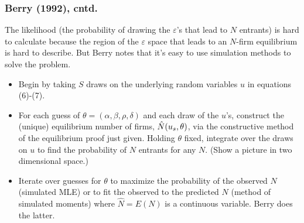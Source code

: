 \begin{frame}%

\frametitle{Berry (1992), cntd.}

The likelihood (the probability of drawing the $\varepsilon $'s that lead to 
$N$ entrants) is hard to calculate because the region of the $\varepsilon $
space that leads to an $N$-firm equilibrium is hard to describe. But Berry
notes that it's easy to use simulation methods to solve the problem.

\begin{itemize}
\item Begin by taking $S$ draws on the underlying random variables $u$ in
equations (6)-(7).

\item For each guess of $\theta =(\alpha ,\beta ,\rho ,\delta )$ and each
draw of the $u$'s, construct the (unique) equilibrium number of firms, $\hat{%
N}(u_{s},\theta )$, via the constructive method of the equilibrium proof
just given. Holding $\theta $ fixed, integrate over the draws on $u$ to find
the probability of $N$ entrants for any $N$. (Show a picture in two
dimensional space.)

\item Iterate over guesses for $\theta $ to maximize the probability of the
observed $N$ (simulated MLE) or to fit the observed to the predicted $N$
(method of simulated moments) where $\hat{N}=E(N)$ is a continuous variable.
Berry does the latter.
\end{itemize}

\end{frame}%

